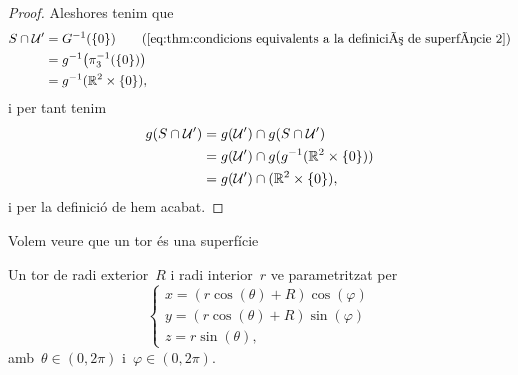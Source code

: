 \documentclass[../../main.tex]{subfiles}
\begin{document}
\begin{proof}
        Aleshores tenim que
        \begin{align*}
            S\cap\obert{U}'&=G^{-1}(\{0\}) \tag{\ref{eq:thm:condicions equivalents a la definició de superfície 2}}\\
            &=g^{-1}\big(\pi_{3}^{-1}(\{0\})\big) \\
            &=g^{-1}(\mathbb{R}^{2}\times\{0\}),
        \end{align*}
        i per tant tenim
        \begin{align*}
            g(S\cap\mathcal{U}')&=g(\mathcal{U}')\cap g(S\cap\mathcal{U}') \\
            &=g(\mathcal{U}')\cap g(g^{-1}(\mathbb{R}^{2}\times\{0\})) \\
            &=g(\mathcal{U}')\cap(\mathbb{R}^{2}\times\{0\}),
        \end{align*}
        i per la definició de  hem acabat.
    \end{proof}
    \begin{example}
        \label{ex:un tor és una superfície}
        Volem veure que un tor és una superfície
    \end{example}
    \begin{solution}
        Un tor de radi exterior~\(R\) i radi interior~\(r\) ve parametritzat per
        \[\begin{cases*}
            x=(r\cos(\theta)+R)\cos(\varphi) \\
            y=(r\cos(\theta)+R)\sin(\varphi) \\
            z=r\sin(\theta),
        \end{cases*}\]
        amb~\(\theta\in(0,2\pi)\) i~\(\varphi\in(0,2\pi)\).
    \end{solution}
\end{document}
